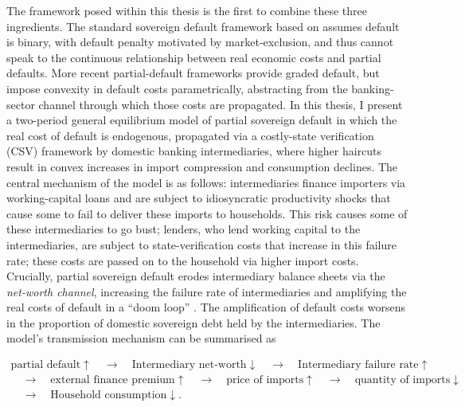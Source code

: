 \documentclass[11pt]{article}
\theoremstyle{definition}
\theoremstyle{plain}
\theoremstyle{remark}
\begin{document}
The framework posed within this thesis is the first to combine these three ingredients. The standard sovereign default framework based on \citet{eaton_debt_1981} assumes default is binary, with default penalty motivated by market-exclusion, and thus cannot speak to the continuous relationship between real economic costs and partial defaults. More recent partial-default frameworks provide graded default, but impose convexity in default costs parametrically, abstracting from the banking-sector channel through which those costs are propagated. In this thesis, I present a two-period general equilibrium model of partial sovereign default in which the real cost of default is endogenous, propagated via a costly-state verification (CSV) framework \citep{bernanke_chapter_1999, townsend_optimal_1979} by domestic banking intermediaries, where higher haircuts result in convex increases in import compression and consumption declines. The central mechanism of the model is as follows: intermediaries finance importers via working-capital loans and are subject to idiosyncratic productivity shocks that cause some to fail to deliver these imports to households. This risk causes some of these intermediaries to go bust; lenders, who lend working capital to the intermediaries, are subject to state-verification costs that increase in this failure rate; these costs are passed on to the household via higher import costs. Crucially, partial sovereign default erodes intermediary balance sheets via the \textit{net-worth channel}, increasing the failure rate of intermediaries and amplifying the real costs of default in a “doom loop” \citep{farhi_deadly_2018, brunnermeier_sovereign-bank_2016}. The amplification of default costs worsens in the proportion of domestic sovereign debt held by the intermediaries. The model’s transmission mechanism can be summarised as 

\begin{gather*}
    \text{partial default}\uparrow \quad \rightarrow \quad \text{Intermediary net-worth}\downarrow \quad \rightarrow \quad \text{Intermediary failure rate} \uparrow \\ \quad \rightarrow \quad \text{external finance premium} \uparrow \quad \rightarrow \quad \text{price of imports}\uparrow \quad \rightarrow \quad \text{quantity of imports} \downarrow \\ \quad \rightarrow \quad \text{Household consumption} \downarrow.
\end{gather*}
\end{document}
